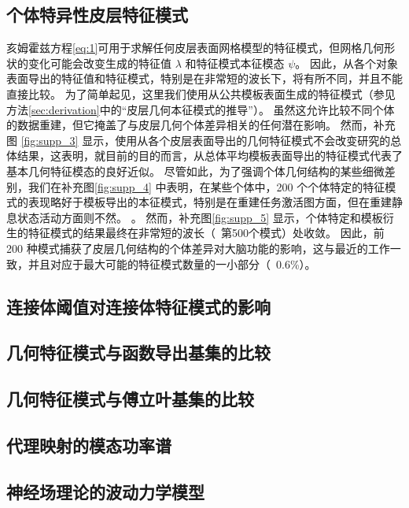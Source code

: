 \documentclass[lang=cn,a4paper,newtx]{elegantpaper}
\begin{document}
\subsection{个体特异性皮层特征模式} \label{sec:individual_specific}
亥姆霍兹方程\ref{eq:1}可用于求解任何皮层表面网格模型的特征模式，但网格几何形状的变化可能会改变生成的特征值 $ \lambda $ 和特征模式本征模态 $ \psi $。
因此，从各个对象表面导出的特征值和特征模式，特别是在非常短的波长下，将有所不同，并且不能直接比较\cite{henderson2022empirical,chen2022individuality}。
为了简单起见，这里我们使用从公共模板表面生成的特征模式（参见方法\ref{sec:derivation}中的“皮层几何本征模式的推导”）。
虽然这允许比较不同个体的数据重建，但它掩盖了与皮层几何个体差异相关的任何潜在影响。
然而，补充图 \ref{fig:supp_3} 显示，使用从各个皮层表面导出的几何特征模式不会改变研究的总体结果，这表明，就目前的目的而言，从总体平均模板表面导出的特征模式代表了基本几何特征模态的良好近似。
尽管如此，为了强调个体几何结构的某些细微差别，我们在补充图\ref{fig:supp_4} 中表明，在某些个体中，200 个个体特定的特征模式的表现略好于模板导出的本征模式，特别是在重建任务激活图方面，但在重建静息状态活动方面则不然。 。 
然而，补充图\ref{fig:supp_5} 显示，个体特定和模板衍生的特征模式的结果最终在非常短的波长（~第500个模式）处收敛。
因此，前 200 种模式捕获了皮层几何结构的个体差异对大脑功能的影响，这与最近的工作\cite{chen2022individuality}一致，并且对应于最大可能的特征模式数量的一小部分（~0.6\%）。


\subsection{连接体阈值对连接体特征模式的影响}


\subsection{几何特征模式与函数导出基集的比较} \label{sec:comparison_eigenmodes_derived}


\subsection{几何特征模式与傅立叶基集的比较} \label{sec:comparison_fourier}


\subsection{代理映射的模态功率谱} \label{sec:modal_power_spectra}

\subsection{神经场理论的波动力学模型} \label{sec:NFT_wave}
\end{document}
